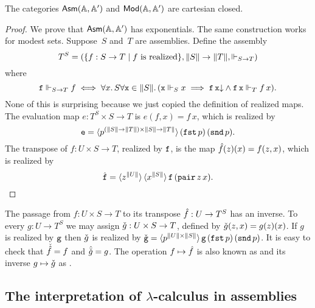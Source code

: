 \begin{proposition}
  \label{prop:asm-ccc}%
  The categories $\AsmA$ and $\ModA$ are cartesian closed.
\end{proposition}

\begin{proof}
  We prove that $\AsmA$ has exponentials. The same construction works
  for modest sets. Suppose~$S$ and~$T$ are assemblies.
  Define the assembly
  \begin{equation*}
    T^{S} =
    (\set{f : S \to T \such \text{$f$ is realized}},
     \T{S} \to \T{T}, {\rz[S \to T]})
  \end{equation*}
  where
  \begin{equation*}
    \R{f} \rz[S \to T] f
    \iff
    \all{x}{S}{
      \all{\R{x} \in \T{S}}
          (\R{x} \rz[S] x \implies
          \defined{\R{f}\,\R{x}} \land
          \R{f}\,\R{x} \rz[T] f\,x)
      }.
  \end{equation*}
  None of this is surprising because we just copied the definition of
  realized maps. The evaluation map $e : T^{S} \times
  S \to T$ is $e(f, x) = f\,x$, which is realized by
  \begin{equation*}
    \R{e} = \tpcalam{p}{(\T{S} \to \T{T}) \times \T{S} \to
      \T{T}}{(\combFst\,p)\,(\combSnd\,p)}.
  \end{equation*}
  The transpose of $f : U \times S \to T$, realized
  by $\R{f}$, is the map $\curry{f}(z)(x) = f(z,x)$, which is realized
  by
  \begin{equation*}
    \curry{\R{f}} = \tpcalam{z}{\T{U}} \tpcalam{x}{\T{S}} \R{f}\,(\combPair\,z\,x).
    \qedhere
  \end{equation*}
\end{proof}

The passage from $f : U \times S \to T$ to its
transpose $\curry{f} : U \to T^{S}$ has an inverse.
To every $g : U \to T^{S}$ we may assign
$\uncurry{g} : U \times S \to T$, defined by
$\uncurry{g}(z,x) = g(z)(x)$. If $g$ is realized by $\R{g}$ then
$\uncurry{g}$ is realized by $\uncurry{\R{g}} = \tpcalam{p}{\T{U}
    \times \T{S}}{\R{g}\,(\combFst\,p)\,(\combSnd\,p)}$. It is easy to
check that $\uncurry{\curry{f}} = f$ and $\curry{\uncurry{g}} = g$.
The operation $f \mapsto \curry{f}$ is also known as 
and its inverse $g \mapsto \uncurry{g}$ as .

\subsection{The interpretation of $\lambda$-calculus in assemblies}
\label{sec:interpr-lambda-calc}

